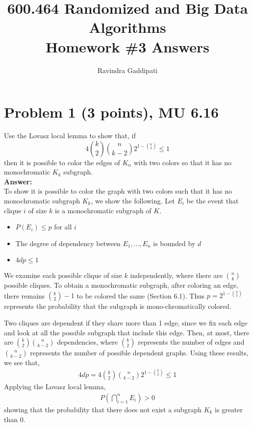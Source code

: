 \documentclass[letterpaper, 11pt]{article}
\begin{document}
\title{600.464 Randomized and Big Data Algorithms \\ Homework \#3 Answers}
\author{Ravindra Gaddipati}


\maketitle

\pagebreak
\section*{Problem 1 (3 points), MU 6.16}
Use the Lovasz local lemma to show that, if
$$4 {k \choose 2} {n \choose {k-2}}2^{1- {k \choose 2}} \leq 1$$
then it is possible to color the edges of $K_n$ with two colors so that it has no monochromatic $K_k$ subgraph.\\
\textbf{Answer:} \\
To show it is possible to color the graph with two colors such that it has no monochromatic subgraph $K_k$, we show the following. Let $E_i$ be the event that clique $i$ of size $k$ is a monochromatic subgraph of $K$.
\begin{itemize}
	\item $P(E_i) \leq p$ for all $i$
	\item The degree of dependency between $E_1,\dots,E_n$ is bounded by $d$
	\item $4dp \leq 1$
\end{itemize}
We examine each possible clique of size $k$ independently, where there are $n \choose k$ possible cliques. To obtain a monochromatic subgraph, after coloring an edge, there remains ${k \choose 2 } - 1$ to be colored the same (Section 6.1). Thus $p=2^{1-{k \choose 2}}$ represents the probability that the subgraph is mono-chromatically colored.

Two cliques are dependent if they share more than 1 edge, since we fix each edge and look at all the possible subgraph that include this edge. Then, at most, there are ${k \choose 2}{n \choose {k-2}}$ dependencies, where ${k \choose 2}$ represents the number of edges and $n \choose {k-2}$ represents the number of possible dependent graphs. Using these results, we see that,
\begin{align}
4dp = 4 {k \choose 2} {n \choose k-2}2^{1-{k \choose 2}} \leq 1
\end{align}
Applying the Lovasz local lemma,
\begin{align}
P\left( \bigcap_{i=1}^n E_i\right) > 0
\end{align}
showing that the probability that there does not exist a subgraph $K_k$ is greater than 0.
\pagebreak
\end{document}
